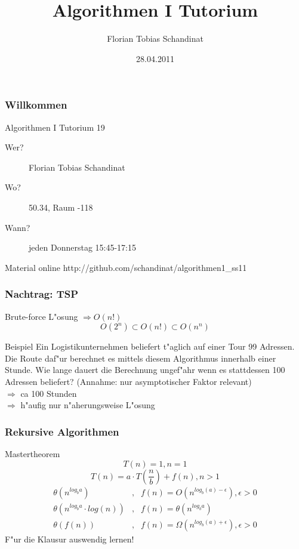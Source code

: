 \documentclass{beamer}
\title{Algorithmen I Tutorium}
\author{Florian Tobias Schandinat}
\date{28.04.2011}
\institute{FTS}
\begin{document}
\begin{frame}
\frametitle{Willkommen}
\begin{block}{Algorithmen I Tutorium 19}
\begin{description}
\item[Wer?] Florian Tobias Schandinat\\
\item[Wo?] 50.34, Raum -118\\
\item[Wann?] jeden Donnerstag 15:45-17:15
\end{description}
\end{block}

\begin{block}{Material online}
http://github.com/schandinat/algorithmen1\_ss11
\end{block}
\end{frame}


\begin{frame}
\frametitle{Nachtrag: TSP}
\begin{block}{Brute-force L"osung}
\pause
$\Rightarrow O(n!)$
$$O(2^n) \subset O(n!) \subset O(n^n)$$
\end{block}

\pause

\begin{exampleblock}{Beispiel}
Ein Logistikunternehmen beliefert t"aglich auf einer Tour 99 Adressen. Die Route daf"ur berechnet es mittels diesem Algorithmus innerhalb einer Stunde. Wie lange dauert die Berechnung ungef"ahr wenn es stattdessen 100 Adressen beliefert? (Annahme: nur asymptotischer Faktor relevant)\\
\pause
$\Rightarrow$ \alert{ca 100 Stunden}\\
$\Longrightarrow$ h"aufig nur n"aherungsweise L"osung
\end{exampleblock}
\end{frame}


\begin{frame}
\frametitle{Rekursive Algorithmen}
\begin{block}{Mastertheorem}
$$T(n) = 1, n = 1$$
$$T(n) = a \cdot T\left(\frac{n}{b}\right) + f(n), n > 1$$
\begin{eqnarray*}
\theta(n^{log_b a})&,& f(n) = O(n^{log_b(a)-\epsilon}), \epsilon > 0\\
\theta(n^{log_b a} \cdot log(n))&,& f(n) = \theta(n^{log_b a})\\
\theta(f(n))&,& f(n) = \Omega(n^{log_b (a)+\epsilon}), \epsilon > 0
\end{eqnarray*}
\pause
\alert{F"ur die Klausur auswendig lernen!}
\end{block}
\end{frame}
\end{document}
